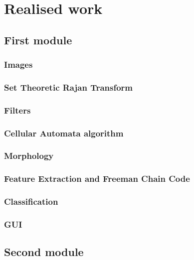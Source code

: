 \chapter{Realised work}


\section{First module}


\subsection{Images}

\subsection{Set Theoretic Rajan Transform}

\subsection{Filters}

\subsection{Cellular Automata algorithm}

\subsection{Morphology}

\subsection{Feature Extraction and Freeman Chain Code}

\subsection{Classification}

\subsection{GUI}




\section{Second module}

